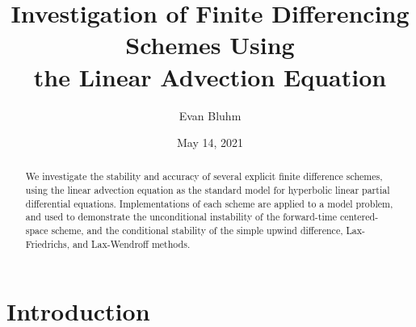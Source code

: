 \documentclass[%
 reprint,
 amsmath,amssymb,
 aps,
]{revtex4-2}
\begin{document}

\title{Investigation of Finite Differencing Schemes Using\\the Linear Advection Equation}%

\author{Evan Bluhm}


\date{May 14, 2021}%
\begin{abstract}

We investigate the stability and accuracy of several explicit finite difference schemes, using the linear advection equation as the standard model for hyperbolic linear partial differential equations. Implementations of each scheme are applied to a model problem, and used to demonstrate the unconditional instability of the forward-time centered-space scheme, and the conditional stability of the simple upwind difference, Lax-Friedrichs, and Lax-Wendroff methods.
\end{abstract}

\maketitle



\section{Introduction}
\end{document}
